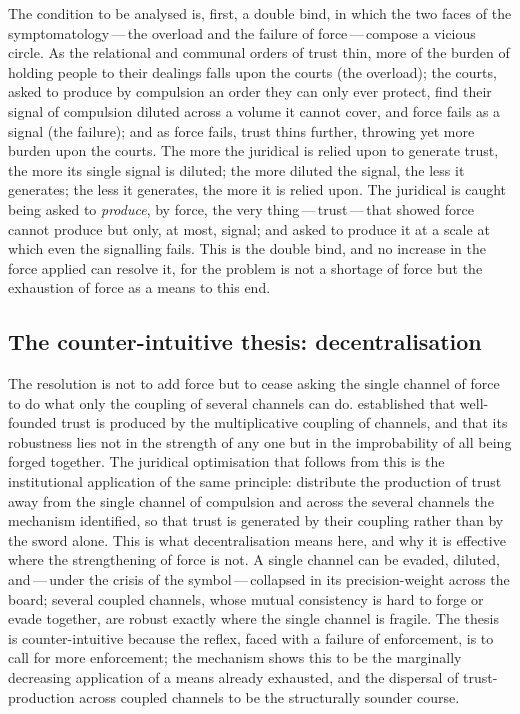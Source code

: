 The condition to be analysed is, first, a double bind, in which the two faces of the symptomatology\,---\,the overload and the failure of force\,---\,compose a vicious circle. As the relational and communal orders of trust thin, more of the burden of holding people to their dealings falls upon the courts (the overload); the courts, asked to produce by compulsion an order they can only ever protect, find their signal of compulsion diluted across a volume it cannot cover, and force fails as a signal (the failure); and as force fails, trust thins further, throwing yet more burden upon the courts. The more the juridical is relied upon to generate trust, the more its single signal is diluted; the more diluted the signal, the less it generates; the less it generates, the more it is relied upon. The juridical is caught being asked to \emph{produce}, by force, the very thing\,---\,trust\,---\,that  showed force cannot produce but only, at most, signal; and asked to produce it at a scale at which even the signalling fails. This is the double bind, and no increase in the force applied can resolve it, for the problem is not a shortage of force but the exhaustion of force as a means to this end.

\subsection{The counter-intuitive thesis: decentralisation}
\label{p13:sub:jud-decentralisation}

The resolution is not to add force but to cease asking the single channel of force to do what only the coupling of several channels can do.  established that well-founded trust is produced by the multiplicative coupling of channels, and that its robustness lies not in the strength of any one but in the improbability of all being forged together. The juridical optimisation that follows from this is the institutional application of the same principle: distribute the production of trust away from the single channel of compulsion and across the several channels the mechanism identified, so that trust is generated by their coupling rather than by the sword alone. This is what decentralisation means here, and why it is effective where the strengthening of force is not. A single channel can be evaded, diluted, and\,---\,under the crisis of the symbol\,---\,collapsed in its precision-weight across the board; several coupled channels, whose mutual consistency is hard to forge or evade together, are robust exactly where the single channel is fragile. The thesis is counter-intuitive because the reflex, faced with a failure of enforcement, is to call for more enforcement; the mechanism shows this to be the marginally decreasing application of a means already exhausted, and the dispersal of trust-production across coupled channels to be the structurally sounder course.

